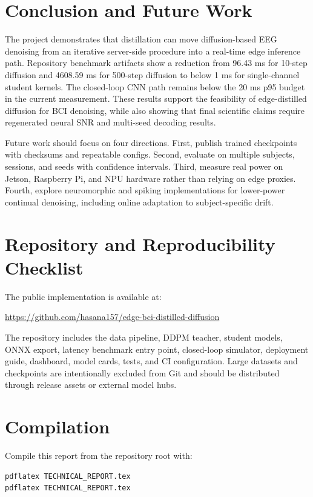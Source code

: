 \documentclass[11pt]{article}
\newcommand{\projectrepo}{https://github.com/hasana157/edge-bci-distilled-diffusion}
\begin{document}
\section{Conclusion and Future Work}

The project demonstrates that distillation can move diffusion-based EEG denoising from an iterative server-side procedure into a real-time edge inference path. Repository benchmark artifacts show a reduction from 96.43 ms for 10-step diffusion and 4608.59 ms for 500-step diffusion to below 1 ms for single-channel student kernels. The closed-loop CNN path remains below the 20 ms p95 budget in the current measurement. These results support the feasibility of edge-distilled diffusion for BCI denoising, while also showing that final scientific claims require regenerated neural SNR and multi-seed decoding results.

Future work should focus on four directions. First, publish trained checkpoints with checksums and repeatable configs. Second, evaluate on multiple subjects, sessions, and seeds with confidence intervals. Third, measure real power on Jetson, Raspberry Pi, and NPU hardware rather than relying on edge proxies. Fourth, explore neuromorphic and spiking implementations for lower-power continual denoising, including online adaptation to subject-specific drift.

\appendix

\section{Repository and Reproducibility Checklist}

The public implementation is available at:
\begin{center}
\url{\projectrepo}
\end{center}
The repository includes the data pipeline, DDPM teacher, student models, ONNX export, latency benchmark entry point, closed-loop simulator, deployment guide, dashboard, model cards, tests, and CI configuration. Large datasets and checkpoints are intentionally excluded from Git and should be distributed through release assets or external model hubs.

\section{Compilation}

Compile this report from the repository root with:
\begin{verbatim}
pdflatex TECHNICAL_REPORT.tex
pdflatex TECHNICAL_REPORT.tex
\end{verbatim}
\end{document}
